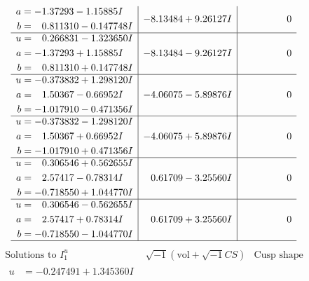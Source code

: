 \documentclass[1p]{elsarticle_modified}
\theoremstyle{definition}
\newcommand{\I}{\sqrt{-1}}
\begin{document}
$$\begin{array}{c|c|c}
\begin{aligned}
a &= -1.37293 - 1.15885 I \\
b &= \phantom{-}0.811310 - 0.147748 I\end{aligned}
 & -8.13484 + 9.26127 I & \phantom{-0.000000 } 0 \\ \hline\begin{aligned}
u &= \phantom{-}0.266831 - 1.323650 I \\
a &= -1.37293 + 1.15885 I \\
b &= \phantom{-}0.811310 + 0.147748 I\end{aligned}
 & -8.13484 - 9.26127 I & \phantom{-0.000000 } 0 \\ \hline\begin{aligned}
u &= -0.373832 + 1.298120 I \\
a &= \phantom{-}1.50367 - 0.66952 I \\
b &= -1.017910 - 0.471356 I\end{aligned}
 & -4.06075 - 5.89876 I & \phantom{-0.000000 } 0 \\ \hline\begin{aligned}
u &= -0.373832 - 1.298120 I \\
a &= \phantom{-}1.50367 + 0.66952 I \\
b &= -1.017910 + 0.471356 I\end{aligned}
 & -4.06075 + 5.89876 I & \phantom{-0.000000 } 0 \\ \hline\begin{aligned}
u &= \phantom{-}0.306546 + 0.562655 I \\
a &= \phantom{-}2.57417 - 0.78314 I \\
b &= -0.718550 + 1.044770 I\end{aligned}
 & \phantom{-}0.61709 - 3.25560 I & \phantom{-0.000000 } 0 \\ \hline\begin{aligned}
u &= \phantom{-}0.306546 - 0.562655 I \\
a &= \phantom{-}2.57417 + 0.78314 I \\
b &= -0.718550 - 1.044770 I\end{aligned}
 & \phantom{-}0.61709 + 3.25560 I & \phantom{-0.000000 } 0\\
 \hline 
 \end{array}$$\newpage$$\begin{array}{c|c|c}  
\text{Solutions to }I^u_{1}& \I (\text{vol} + \sqrt{-1}CS) & \text{Cusp shape}\\
 \hline 
\begin{aligned}
u &= -0.247491 + 1.345360 I \\

\end{aligned}
\end{array}$$
\end{document}
